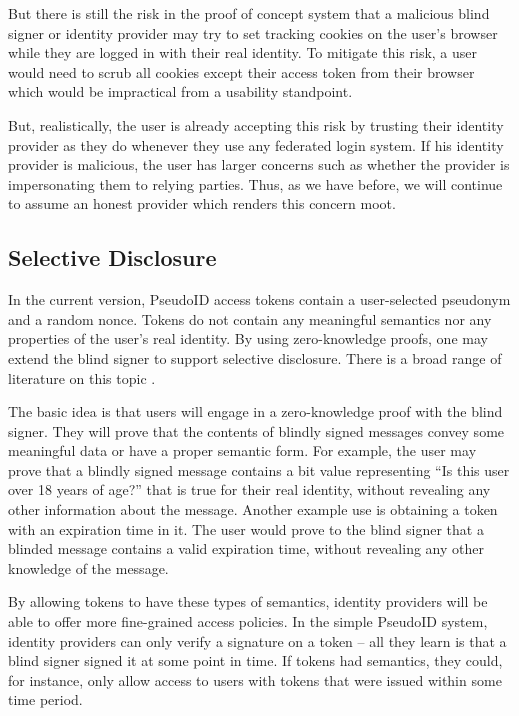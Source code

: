 \documentclass[11pt]{llncs}
\begin{document}
But there is still the risk in the proof of concept system that a malicious
blind signer or identity provider may try to set tracking cookies on
the user's browser while they are logged in with their real
identity. To mitigate this risk, a user would need to scrub all cookies
except their access token from their browser which would be impractical
from a usability standpoint. 

But, realistically, the user is already
accepting this risk by trusting their identity provider as they do
whenever they use any federated login system. If his identity provider
is malicious, the user has larger concerns such as whether the provider
is impersonating them to relying parties. Thus, as we have before,
we will continue to assume an honest provider which renders this concern moot. 

\subsection{Selective Disclosure}

In the current version, PseudoID access tokens contain a user-selected
pseudonym and a random nonce. Tokens do not contain any meaningful
semantics nor any properties of the user's real identity. By using
zero-knowledge proofs, one may extend the blind signer to support
selective disclosure. There is a broad range of literature on this
topic \cite{Cha85,CaLy01,CaLy04,CHL05,CaGr08}.

The basic idea is that users will engage in a zero-knowledge proof
with the blind signer. They will prove that the contents of blindly
signed messages convey some meaningful data or have a proper semantic
form. For example, the user may prove that a blindly signed message
contains a bit value representing ``Is this user over 18 years of
age?'' that is true for their real identity, without revealing any
other information about the message. Another example use is obtaining
a token with an expiration time in it. The user would prove to the
blind signer that a blinded message contains a valid expiration time,
without revealing any other knowledge of the message.

By allowing tokens to have these types of semantics, identity
providers will be able to offer more fine-grained access policies. In
the simple PseudoID system, identity providers can only verify a signature on a
token -- all they learn is that a blind signer signed it at some point
in time. If tokens had semantics, they could, for instance, only allow
access to users with tokens that were issued within some time period.
\end{document}
